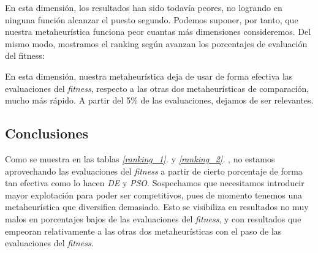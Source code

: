 \documentclass[11pt]{article}
\begin{document}
En esta dimensión, los resultados han sido todavía peores, no logrando en ninguna función alcanzar el puesto segundo. Podemos suponer, por tanto, que nuestra metaheurística funciona peor cuantas más dimensiones consideremos. Del mismo modo, mostramos el ranking según avanzan los porcentajes de evaluación del fitness:


\begin{table}[H]
\centering
{}
    \caption{Ranking según el avance del porcentaje de evaluaciones consumidas}
    \label{ranking_2}
\end{table}

En esta dimensión, nuestra metaheurística deja de usar de forma efectiva las evaluaciones del \emph{fitness}, respecto a las otras dos metaheurísticas de comparación, mucho más rápido. A partir del 5\% de las evaluaciones, dejamos de ser relevantes.

\subsection{Conclusiones}

Como se muestra en las tablas \emph{\ref{ranking_1}. } y \emph{\ref{ranking_2}. }, no estamos aprovechando las evaluaciones del \emph{fitness} a partir de cierto porcentaje de forma tan efectiva como lo hacen \emph{DE} y \emph{PSO}. Sospechamos que necesitamos introducir mayor explotación para poder ser competitivos, pues de momento tenemos una metaheurística que diversifica demasiado. Esto se visibiliza en resultados no muy malos en porcentajes bajos de las evaluaciones del \emph{fitness}, y con resultados que empeoran relativamente a las otras dos metaheurísticas con el paso de las evaluaciones del \emph{fitness}.
\end{document}
